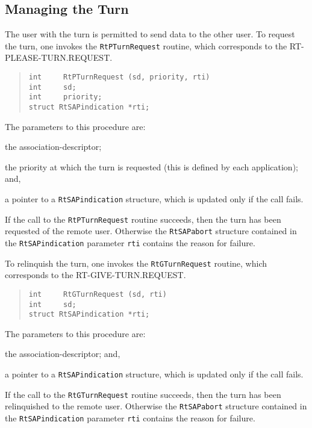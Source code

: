 \subsection	{Managing the Turn}
The user with the turn is permitted to send data to the other user.
To request the turn,
one invokes the \verb"RtPTurnRequest" routine,
which corresponds to the {\sf RT-PLEASE-TURN.REQUEST}.
\begin{quote}\small\begin{verbatim}
int     RtPTurnRequest (sd, priority, rti)
int     sd;
int     priority;
struct RtSAPindication *rti;
\end{verbatim}\end{quote}
The parameters to this procedure are:
\begin{describe}
\item[\verb"sd":] the association-descriptor;

\item[\verb"priority":] the priority at which the turn is requested
(this is defined by each application);
and,

\item[\verb"rti":] a pointer to a \verb"RtSAPindication" structure, which is
updated only if the call fails.
\end{describe}
If the call to the \verb"RtPTurnRequest" routine succeeds,
then the turn has been requested of the remote user.
Otherwise the \verb"RtSAPabort" structure contained in
the \verb"RtSAPindication" parameter
\verb"rti" contains the reason for failure.

To relinquish the turn,
one invokes the \verb"RtGTurnRequest" routine,
which corresponds to the {\sf RT-GIVE-TURN.REQUEST}.
\begin{quote}\small\begin{verbatim}
int     RtGTurnRequest (sd, rti)
int     sd;
struct RtSAPindication *rti;
\end{verbatim}\end{quote}
The parameters to this procedure are:
\begin{describe}
\item[\verb"sd":] the association-descriptor;
and,

\item[\verb"rti":] a pointer to a \verb"RtSAPindication" structure, which is
updated only if the call fails.
\end{describe}
If the call to the \verb"RtGTurnRequest" routine succeeds,
then the turn has been relinquished to the remote user.
Otherwise the \verb"RtSAPabort" structure contained in
the \verb"RtSAPindication" parameter
\verb"rti" contains the reason for failure.

